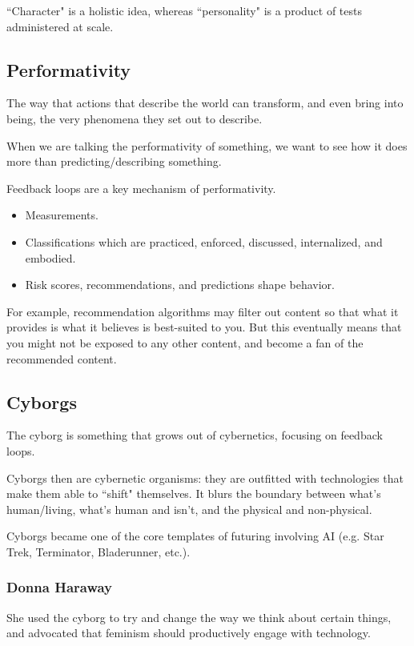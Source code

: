 \documentclass[openany]{book}
\begin{document}
``Character" is a holistic idea, whereas ``personality" is a product of tests administered at scale.

\subsection{Performativity}
\begin{defn}
	The way that actions that describe the world can transform, and even bring into being, the very phenomena they set out to describe.
\end{defn}

When we are talking the performativity of something, we want to see how it does more than predicting/describing something.

Feedback loops are a key mechanism of performativity.
\begin{itemize}
	\item Measurements.
	\item Classifications which are practiced, enforced, discussed, internalized, and embodied.
	\item Risk scores, recommendations, and predictions shape behavior.
\end{itemize}

\begin{example}
	For example, recommendation algorithms may filter out content so that what it provides is what it believes is best-suited to you. But this eventually means that you might not be exposed to any other content, and become a fan of the recommended content.
\end{example}

\subsection{Cyborgs}
The cyborg is something that grows out of cybernetics, focusing on feedback loops.

Cyborgs then are cybernetic organisms: they are outfitted with technologies that make them able to ``shift" themselves. It blurs the boundary between what's human/living, what's human and isn't, and the physical and non-physical.

Cyborgs became one of the core templates of futuring involving AI (e.g. Star Trek, Terminator, Bladerunner, etc.).

\subsubsection{Donna Haraway}
She used the cyborg to try and change the way we think about certain things, and advocated that feminism should productively engage with technology.
\end{document}

